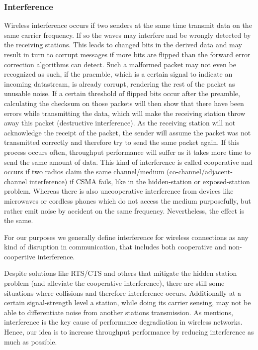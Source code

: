       \subsubsection{Interference}
	Wireless interference occurs if two senders at the same time transmit data on the same carrier frequency. If so the waves may interfere and be wrongly detected
	by the receiving stations. This leads to changed bits in the derived data and may result in turn to corrupt messages if more bits are flipped than the
	forward error correction algorithms can detect. Such a malformed packet may not even be recognized as such, if the praemble, which is a certain signal to indicate an
	incoming datastream, is already corrupt, rendering the rest of the packet as unusable noise. If a certain threshold of flipped bits occur after the preamble,
	calculating the checksum on those packets will then show that there have been errors while transmitting the data, which will make the receiving station 
	throw away this packet (destructive interference).
	As the receiving station will not acknowledge the receipt of the packet, the sender will assume the packet was not transmitted correctly and therefore try 
	to send the same packet again. If this process occurs often, throughput performance will suffer as it takes more time to send the same amount of data.
	This kind of interference is called cooperative and occurs if two radios claim the same channel/medium (co-channel/adjacent-channel interference) if CSMA fails,
	like in the hidden-station or exposed-station problem.
	Whereas there is also uncooperative interference from devices like microwaves or cordless phones which do not access the medium purposefully, but rather
	emit noise by accident on the same frequency. Nevertheless, the effect is the same.
	
	For our purposes we generally define interference for wireless connections as any kind of disruption in communication, 
	that includes both cooperative and non-coopertive interference.
	
	Despite solutions like RTS/CTS and others that mitigate the hidden station problem (and alleviate the cooperative interference),
	there are still some situations where collisions and therefore interference occurs.
	Additionally at a certain signal-strength level a station, while doing its carrier sensing, may not be able to differentiate noise from another stations transmission.
	As \cite{padhye2005estimation} mentions, interference is the key cause of performance degradiation in wireless networks. Hence, our idea is to increase throughput 
	performance by reducing interference as much as possible.
	
